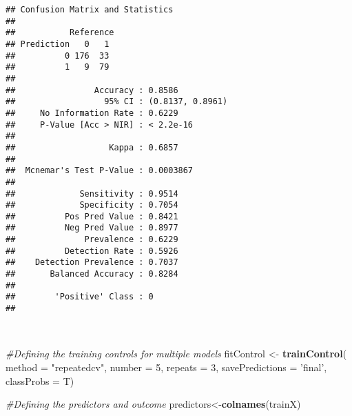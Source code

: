 \documentclass[
]{article}
\newenvironment{Shaded}{\begin{snugshade}}{\end{snugshade}}
\newcommand{\CommentTok}[1]{\textcolor[rgb]{0.56,0.35,0.01}{\textit{#1}}}
\newcommand{\DataTypeTok}[1]{\textcolor[rgb]{0.13,0.29,0.53}{#1}}
\newcommand{\DecValTok}[1]{\textcolor[rgb]{0.00,0.00,0.81}{#1}}
\newcommand{\KeywordTok}[1]{\textcolor[rgb]{0.13,0.29,0.53}{\textbf{#1}}}
\newcommand{\NormalTok}[1]{#1}
\newcommand{\StringTok}[1]{\textcolor[rgb]{0.31,0.60,0.02}{#1}}
\begin{document}
\begin{verbatim}
## Confusion Matrix and Statistics
## 
##           Reference
## Prediction   0   1
##          0 176  33
##          1   9  79
##                                           
##                Accuracy : 0.8586          
##                  95% CI : (0.8137, 0.8961)
##     No Information Rate : 0.6229          
##     P-Value [Acc > NIR] : < 2.2e-16       
##                                           
##                   Kappa : 0.6857          
##                                           
##  Mcnemar's Test P-Value : 0.0003867       
##                                           
##             Sensitivity : 0.9514          
##             Specificity : 0.7054          
##          Pos Pred Value : 0.8421          
##          Neg Pred Value : 0.8977          
##              Prevalence : 0.6229          
##          Detection Rate : 0.5926          
##    Detection Prevalence : 0.7037          
##       Balanced Accuracy : 0.8284          
##                                           
##        'Positive' Class : 0               
## 
\end{verbatim}

\texttt{}\\
\texttt{}

\begin{Shaded}
\begin{Highlighting}[]
\CommentTok{#Defining the training controls for multiple models}
\NormalTok{fitControl <-}\StringTok{ }\KeywordTok{trainControl}\NormalTok{(}
  \DataTypeTok{method =} \StringTok{"repeatedcv"}\NormalTok{,}
  \DataTypeTok{number =} \DecValTok{5}\NormalTok{,}
  \DataTypeTok{repeats =} \DecValTok{3}\NormalTok{,}
\DataTypeTok{savePredictions =} \StringTok{'final'}\NormalTok{,}
\DataTypeTok{classProbs =}\NormalTok{ T)}

\CommentTok{#Defining the predictors and outcome}
\NormalTok{predictors<-}\KeywordTok{colnames}\NormalTok{(trainX)}
\end{Highlighting}
\end{Shaded}

\texttt{}~\\
\texttt{}

\begin{Shaded}
\end{Shaded}
\end{document}
